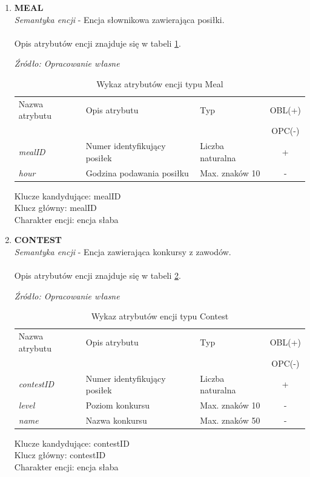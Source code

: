 \documentclass[12pt,oneside]{report}
\begin{document}
\begin{enumerate}[start=10,label={\bfseries ENC$\backslash$\arabic*}]
\item \textbf{MEAL} \\
\textit{Semantyka encji} - Encja słownikowa zawierająca posiłki.
\\ \\
Opis atrybutów encji znajduje się w tabeli \ref{MealAtribute}.

\begin{table}[H]
	\caption{Wykaz atrybutów encji typu Meal}
	\textit{Źródło: Opracowanie własne}
	\label{MealAtribute}
	\centering
	\begin{tabular}{|l|l|l|c|}
		\hline
		Nazwa atrybutu & Opis atrybutu & Typ & OBL(+) \\
		& & &  OPC(-) \\
		\hline
		\textit{mealID} & Numer identyfikujący posiłek & Liczba naturalna & + \\
		\hline
		\textit{hour} & Godzina podawania posiłku & Max. znaków 10 & - \\
		\hline
	\end{tabular}
\end{table}
Klucze kandydujące: mealID \\
Klucz główny: mealID \\
Charakter encji: encja słaba \\

\item \textbf{CONTEST} \\
\textit{Semantyka encji} - Encja zawierająca konkursy z zawodów.
\\ \\
Opis atrybutów encji znajduje się w tabeli \ref{ContestAtribute}.

\begin{table}[H]
	\caption{Wykaz atrybutów encji typu Contest}
	\textit{Źródło: Opracowanie własne}
	\label{ContestAtribute}
	\centering
	\begin{tabular}{|l|l|l|c|}
		\hline
		Nazwa atrybutu & Opis atrybutu & Typ & OBL(+) \\
		& & &  OPC(-) \\
		\hline
		\textit{contestID} & Numer identyfikujący posiłek & Liczba naturalna & + \\
		\hline
		\textit{level} & Poziom konkursu & Max. znaków 10 & - \\
		\hline		
		\textit{name} & Nazwa konkursu & Max. znaków 50 & - \\
		\hline
	\end{tabular}
\end{table}
Klucze kandydujące: contestID \\
Klucz główny: contestID \\
Charakter encji: encja słaba \\
\end{enumerate}
\end{document}
